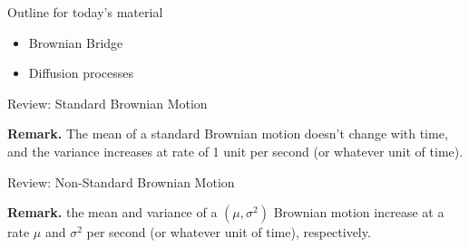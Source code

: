 \documentclass[10pt]{beamer}
\begin{document}
\begin{frame}[standout]
Outline for today's material
\begin{itemize}
\item \textbullet \quad Brownian Bridge
\item \textbullet \quad \alert{Diffusion processes}
\end{itemize}

\end{frame}

\begin{frame}{Review: Standard Brownian Motion}

	
\vfill 
\pause 
\colorbox{green!30}{\textbf{Remark.}} The mean of a standard Brownian motion doesn't change with time, and the variance  increases at rate of 1 unit per second (or whatever unit of time).
\end{frame}

\begin{frame}{Review: Non-Standard Brownian Motion}

	
\vfill 
\pause 
\colorbox{green!30}{\textbf{Remark.}}  the mean and variance of a $(\mu, \sigma^2)$ Brownian motion increase at a rate $\mu$ and $\sigma^2$ per second (or whatever unit of time), respectively.

\end{frame}
\end{document}

